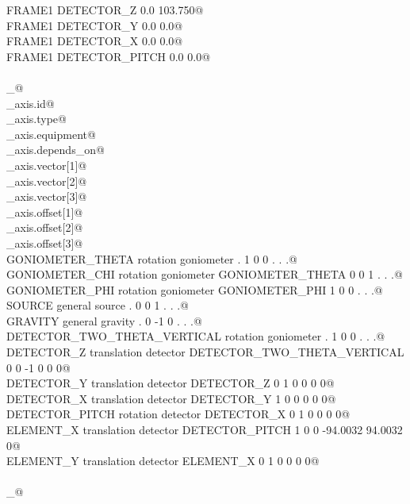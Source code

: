\documentclass[10pt,a4paper,twoside,notitlepage]{article}
\begin{document}
\begin{flushleft}
\begin{minipage}{\linewidth}
\begin{list}{}{}
\mbox{}\verb@ FRAME1 DETECTOR_Z 0.0 103.750@\\
\mbox{}\verb@ FRAME1 DETECTOR_Y 0.0 0.0@\\
\mbox{}\verb@ FRAME1 DETECTOR_X 0.0 0.0@\\
\mbox{}\verb@ FRAME1 DETECTOR_PITCH 0.0 0.0@\\
\mbox{}\verb@@\\
\mbox{}\verb@loop_@\\
\mbox{}\verb@_axis.id@\\
\mbox{}\verb@_axis.type@\\
\mbox{}\verb@_axis.equipment@\\
\mbox{}\verb@_axis.depends_on@\\
\mbox{}\verb@_axis.vector[1]@\\
\mbox{}\verb@_axis.vector[2]@\\
\mbox{}\verb@_axis.vector[3]@\\
\mbox{}\verb@_axis.offset[1]@\\
\mbox{}\verb@_axis.offset[2]@\\
\mbox{}\verb@_axis.offset[3]@\\
\mbox{}\verb@ GONIOMETER_THETA rotation goniometer . 1 0 0 . . .@\\
\mbox{}\verb@ GONIOMETER_CHI rotation goniometer GONIOMETER_THETA 0 0 1 . . .@\\
\mbox{}\verb@ GONIOMETER_PHI rotation goniometer GONIOMETER_PHI 1 0 0 . . .@\\
\mbox{}\verb@ SOURCE general source . 0 0 1 . . .@\\
\mbox{}\verb@ GRAVITY general gravity . 0 -1 0 . . .@\\
\mbox{}\verb@ DETECTOR_TWO_THETA_VERTICAL rotation goniometer . 1 0 0 . . .@\\
\mbox{}\verb@ DETECTOR_Z translation detector DETECTOR_TWO_THETA_VERTICAL 0 0 -1 0 0 0@\\
\mbox{}\verb@ DETECTOR_Y translation detector DETECTOR_Z 0 1 0 0 0 0@\\
\mbox{}\verb@ DETECTOR_X translation detector DETECTOR_Y 1 0 0 0 0 0@\\
\mbox{}\verb@ DETECTOR_PITCH rotation detector DETECTOR_X 0 1 0 0 0 0@\\
\mbox{}\verb@ ELEMENT_X translation detector DETECTOR_PITCH 1 0 0 -94.0032 94.0032 0@\\
\mbox{}\verb@ ELEMENT_Y translation detector ELEMENT_X 0 1 0 0 0 0@\\
\mbox{}\verb@@\\
\mbox{}\verb@loop_@\\

\end{list}
\end{minipage}
\end{flushleft}
\end{document}
